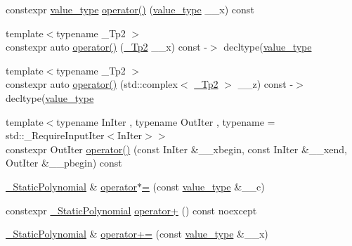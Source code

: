 \begin{DoxyCompactItemize}
\item 
constexpr \hyperlink{class____gnu__cxx_1_1__StaticPolynomial_aad5f3d6d5876b6926b30724aeac649d6}{value\+\_\+type} \hyperlink{class____gnu__cxx_1_1__StaticPolynomial_a208f6efc6cb281333244121edb6d0a21}{operator()} (\hyperlink{class____gnu__cxx_1_1__StaticPolynomial_aad5f3d6d5876b6926b30724aeac649d6}{value\+\_\+type} \+\_\+\+\_\+x) const
\item 
{\footnotesize template$<$typename \+\_\+\+Tp2 $>$ }\\constexpr auto \hyperlink{class____gnu__cxx_1_1__StaticPolynomial_a8e325d80a173e9a39d6493797550947f}{operator()} (\hyperlink{class____gnu__cxx_1_1__StaticPolynomial_a688f26b7c706701416fad299240aa856}{\+\_\+\+Tp2} \+\_\+\+\_\+x) const -\/$>$ decltype(\hyperlink{class____gnu__cxx_1_1__StaticPolynomial_aad5f3d6d5876b6926b30724aeac649d6}{value\+\_\+type}
\item 
{\footnotesize template$<$typename \+\_\+\+Tp2 $>$ }\\constexpr auto \hyperlink{class____gnu__cxx_1_1__StaticPolynomial_a38a6e07a38db4d58e532148b8bc6c26b}{operator()} (std\+::complex$<$ \hyperlink{class____gnu__cxx_1_1__StaticPolynomial_a688f26b7c706701416fad299240aa856}{\+\_\+\+Tp2} $>$ \+\_\+\+\_\+z) const -\/$>$ decltype(\hyperlink{class____gnu__cxx_1_1__StaticPolynomial_aad5f3d6d5876b6926b30724aeac649d6}{value\+\_\+type}
\item 
{\footnotesize template$<$typename In\+Iter , typename Out\+Iter , typename  = std\+::\+\_\+\+Require\+Input\+Iter$<$\+In\+Iter$>$$>$ }\\constexpr Out\+Iter \hyperlink{class____gnu__cxx_1_1__StaticPolynomial_a0a3640688cb677fdc30a6035e38642cb}{operator()} (const In\+Iter \&\+\_\+\+\_\+xbegin, const In\+Iter \&\+\_\+\+\_\+xend, Out\+Iter \&\+\_\+\+\_\+pbegin) const
\item 
\hyperlink{class____gnu__cxx_1_1__StaticPolynomial}{\+\_\+\+Static\+Polynomial} \& \hyperlink{class____gnu__cxx_1_1__StaticPolynomial_ace79869d7827c6aa59519f5f3860f41a}{operator$\ast$=} (const \hyperlink{class____gnu__cxx_1_1__StaticPolynomial_aad5f3d6d5876b6926b30724aeac649d6}{value\+\_\+type} \&\+\_\+\+\_\+c)
\item 
constexpr \hyperlink{class____gnu__cxx_1_1__StaticPolynomial}{\+\_\+\+Static\+Polynomial} \hyperlink{class____gnu__cxx_1_1__StaticPolynomial_a12e71deb96cf5d1d41bbad7339ca77aa}{operator+} () const noexcept
\item 
\hyperlink{class____gnu__cxx_1_1__StaticPolynomial}{\+\_\+\+Static\+Polynomial} \& \hyperlink{class____gnu__cxx_1_1__StaticPolynomial_a5ff7f8de0762113bd83f264bf7cb0c0b}{operator+=} (const \hyperlink{class____gnu__cxx_1_1__StaticPolynomial_aad5f3d6d5876b6926b30724aeac649d6}{value\+\_\+type} \&\+\_\+\+\_\+x)

\end{DoxyCompactItemize}
